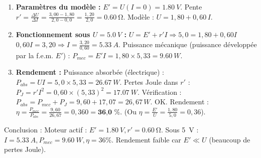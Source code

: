 \documentclass[11pt]{article}
\newcommand{\cle}[1]{{\popxbold\color{popdark}#1}}
\begin{document}
\begin{exoresolu}
\begin{enumerate}
    $\rightarrow$ C'est un \textbf{récepteur actif} (modèle : $E'$ en série avec $r'$).
    \item \textbf{Paramètres du modèle :}
    $E' = U(I=0) = \SI{1,80}{V}$.
    Pente $r' = \frac{\Delta U}{\Delta I} = \frac{3,00 - 1,80}{2,0 - 0,0} = \frac{1,20}{2,0} = \SI{0,60}{\ohm}$.
    Modèle : $U = 1,80 + 0,60\,I$.
    \item \textbf{Fonctionnement sous $U = \SI{5,0}{V}$ :}
    $U = E' + r' I \Rightarrow 5,0 = 1,80 + 0,60 I$
    $0,60 I = 3,20 \Rightarrow I = \frac{3,20}{0,60} = \SI{5,33}{A}$.
    Puissance mécanique (puissance développée par la f.e.m. $E'$) :
    $P_{mec} = E' I = 1,80 \times 5,33 = \SI{9,60}{W}$.
    \item \textbf{Rendement :}
    Puissance absorbée (électrique) : $P_{abs} = U I = 5,0 \times 5,33 = \SI{26,67}{W}$.
    Pertes Joule dans $r'$ : $P_J = r' I^2 = 0,60 \times (5,33)^2 = \SI{17,07}{W}$.
    Vérification : $P_{abs} = P_{mec} + P_J = 9,60 + 17,07 = 26,67\,\si{W}$. OK.
    Rendement : $\eta = \frac{P_{mec}}{P_{abs}} = \frac{9,60}{26,67} = 0,360 = \textbf{36,0 \%}$.
    (Ou $\eta = \frac{E'}{U} = \frac{1,80}{5,0} = 0,36$).
\end{enumerate}
\cle{Conclusion} : Moteur actif : $E'=\SI{1,80}{V}, r'=\SI{0,60}{\ohm}$. Sous \SI{5}{V} : $I=\SI{5,33}{A}, P_{mec}=\SI{9,60}{W}, \eta=36\%$. Rendement faible car $E' \ll U$ (beaucoup de pertes Joule).
\end{exoresolu}
\end{document}

